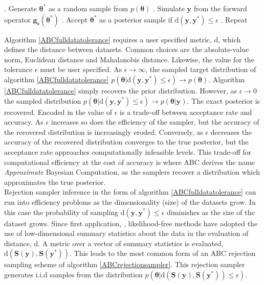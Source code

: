 \begin{algorithm}[H]
	\caption{ }
	\begin{algorithmic}
		. Generate $\bm{\theta^*}$ as a random sample from $p(\bm{\theta})$		
		. Simulate $\bm{y}$ from the forward operator $\bm{g_s}(\bm{\theta^*})$		
		. Accept $\bm{\theta^*}$ as a posterior sample if $\text{d}(\bm{y},\bm{y^*})\leq\epsilon$		
		. Repeat
	\end{algorithmic}
	\label{ABCfulldatatolerance}
\end{algorithm}

Algorithm \ref{ABCfulldatatolerance} requires a user specified metric, $\text{d}$, which defines the distance between datasets. Common choices are the absolute-value norm, Euclidean distance and Mahalanobis distance. Likewise, the value for the tolerance $\epsilon$ must be user specified. As $\epsilon \rightarrow \infty$, the sampled target distribution of algorithm \ref{ABCfulldatatolerance} $p(\bm{\theta}|\text{d}(\bm{y},\bm{y^*})\leq\epsilon) \rightarrow p(\bm{\theta})$.  Algorithm \ref{ABCfulldatatolerance} simply recovers the prior distribution. However, as $\epsilon \rightarrow 0$ the sampled distribution $p(\bm{\theta}|\text{d}(\bm{y},\bm{y^*})\leq\epsilon) \rightarrow p(\bm{\theta}|\bm{y})$. The exact posterior is recovered. Encoded in the value of $\epsilon$ is a trade-off between acceptance rate and accuracy. As $\epsilon$ increases so does the efficiency of the sampler, but the accuracy of the recovered distribution is increasingly eroded. Conversely, as $\epsilon$ decreases the accuracy of the recovered distribution converges to the true posterior, but the acceptance rate approaches computationally infeasible levels. This trade-off for computational efficiency at the cost of accuracy is where ABC derives the name \textit{Approximate} Bayesian Computation, as the samplers recover a distribution which approximates the true posterior.\\

Rejection sampler inference in the form of algorithm \ref{ABCfulldatatolerance} can run into efficiency problems as the dimensionality (size) of the datasets grow. In this case the probability of sampling $\text{d}(\bm{y},\bm{y^*})\leq\epsilon$ diminishes as the size of the dataset grows. Since first application, \citet{Tavare1997}, likelihood-free methods have adopted the use of low-dimensional summary statistics about the data in the evaluation of distance, $\text{d}$. A metric over a vector of summary statistics is evaluated, $\text{d}(\bm{S}(\bm{y}),\bm{S}(\bm{y^*}))$. This leads to the most common form of an ABC rejection sampling scheme of algorithm \ref{ABCrejectionsampler}. This rejection sampler generates i.i.d samples from the distribution $p(\bm{\theta}|\text{d}(\bm{S}(\bm{y}),\bm{S}(\bm{y^*}))\leq\epsilon)$.

